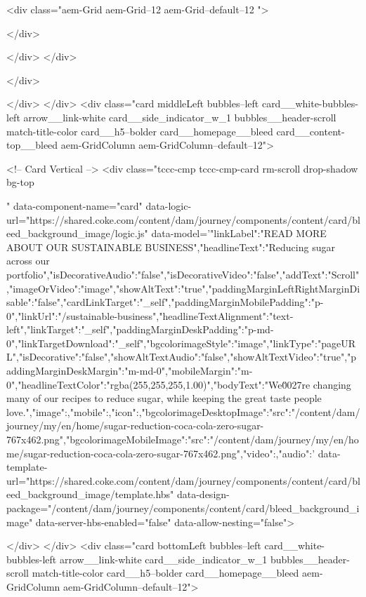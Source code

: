 <div class="aem-Grid aem-Grid--12 aem-Grid--default--12 ">
    
    
    
</div>

  </div>
</div>

</div>

    
</div>
</div>
<div class="card middleLeft bubbles--left card__white-bubbles-left arrow__link-white card__side_indicator_w_1 bubbles__header-scroll match-title-color card__h5--bolder card__homepage__bleed card__content-top__bleed aem-GridColumn aem-GridColumn--default--12">
    




  



<!-- Card Vertical -->
<div class="tccc-cmp tccc-cmp-card rm-scroll drop-shadow bg-top 
  
  " data-component-name="card" data-logic-url="https://shared.coke.com/content/dam/journey/components/content/card/bleed_background_image/logic.js" data-model='{"linkLabel":"READ MORE ABOUT OUR SUSTAINABLE BUSINESS","headlineText":"Reducing sugar across our portfolio","isDecorativeAudio":"false","isDecorativeVideo":"false","addText":"Scroll","imageOrVideo":"image","showAltText":"true","paddingMarginLeftRightMarginDisable":"false","cardLinkTarget":"_self","paddingMarginMobilePadding":"p-0","linkUrl":"/sustainable-business","headlineTextAlignment":"text-left","linkTarget":"_self","paddingMarginDeskPadding":"p-md-0","linkTargetDownload":"_self","bgcolorimageStyle":"image","linkType":"pageURL","isDecorative":"false","showAltTextAudio":"false","showAltTextVideo":"true","paddingMarginDeskMargin":"m-md-0","mobileMargin":"m-0","headlineTextColor":"rgba(255,255,255,1.00)","bodyText":"We\u0027re changing many of our recipes to reduce sugar, while keeping the great taste people love.","image":{},"mobile":{},"icon":{},"bgcolorimageDesktopImage":{"src":"/content/dam/journey/my/en/home/sugar-reduction-coca-cola-zero-sugar-767x462.png"},"bgcolorimageMobileImage":{"src":"/content/dam/journey/my/en/home/sugar-reduction-coca-cola-zero-sugar-767x462.png"},"video":{},"audio":{}}' data-template-url="https://shared.coke.com/content/dam/journey/components/content/card/bleed_background_image/template.hbs" data-design-package="/content/dam/journey/components/content/card/bleed_background_image" data-server-hbs-enabled="false" data-allow-nesting="false">
  
  
</div>
</div>
<div class="card bottomLeft bubbles--left card__white-bubbles-left arrow__link-white card__side_indicator_w_1 bubbles__header-scroll match-title-color card__h5--bolder card__homepage__bleed aem-GridColumn aem-GridColumn--default--12">
    




